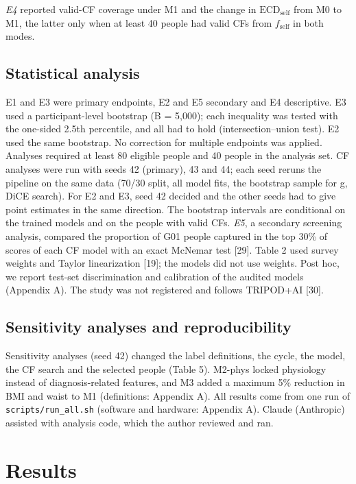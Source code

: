 \documentclass[final,5p,times,twocolumn]{elsarticle}
\begin{document}
\emph{E4} reported valid-CF coverage under M1 and the change in
\(\mathrm{ECD}_{\mathrm{self}}\) from M0 to M1, the latter only when at
least 40 people had valid CFs from \(f_{\mathrm{self}}\) in both modes.

\subsection{Statistical analysis}

E1 and E3 were primary endpoints, E2 and E5 secondary and E4
descriptive. E3 used a participant-level bootstrap (B = 5,000); each
inequality was tested with the one-sided 2.5th percentile, and all had
to hold (intersection--union test). E2 used the same bootstrap. No
correction for multiple endpoints was applied. Analyses required at
least 80 eligible people and 40 people in the analysis set. CF analyses
were run with seeds 42 (primary), 43 and 44; each seed reruns the
pipeline on the same data (70/30 split, all model fits, the bootstrap
sample for g, DiCE search). For E2 and E3, seed 42 decided and the other
seeds had to give point estimates in the same direction. The bootstrap
intervals are conditional on the trained models and on the people with
valid CFs. \emph{E5}, a secondary screening analysis, compared the
proportion of G01 people captured in the top 30\% of scores of each CF
model with an exact McNemar test {[}29{]}. Table 2 used survey weights
and Taylor linearization {[}19{]}; the models did not use weights. Post
hoc, we report test-set discrimination and calibration of the audited
models (Appendix A). The study was not registered and follows TRIPOD+AI
{[}30{]}.

\subsection{Sensitivity analyses and reproducibility}

Sensitivity analyses (seed 42) changed the label definitions, the cycle,
the model, the CF search and the selected people (Table 5). M2-phys
locked physiology instead of diagnosis-related features, and M3 added a
maximum 5\% reduction in BMI and waist to M1 (definitions: Appendix A).
All results come from one run of
\texttt{scripts/\allowbreak{}run\_\allowbreak{}all.sh} (software and
hardware: Appendix A). Claude (Anthropic) assisted with analysis code,
which the author reviewed and ran.

\section{Results}
\end{document}
